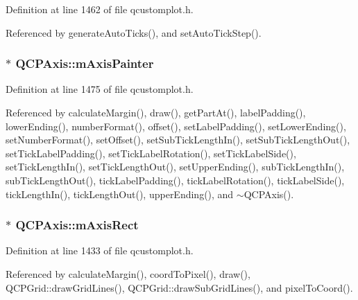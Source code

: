 Definition at line 1462 of file qcustomplot.\+h.



Referenced by generate\+Auto\+Ticks(), and set\+Auto\+Tick\+Step().

\hypertarget{class_q_c_p_axis_aeeae00935bd2dab82d64f32544a90913}{}
\subsubsection[{m\+Axis\+Painter}]{$\ast$ Q\+C\+P\+Axis\+::m\+Axis\+Painter\hspace{0.3cm}{\ttfamily [protected]}}\label{class_q_c_p_axis_aeeae00935bd2dab82d64f32544a90913}


Definition at line 1475 of file qcustomplot.\+h.



Referenced by calculate\+Margin(), draw(), get\+Part\+At(), label\+Padding(), lower\+Ending(), number\+Format(), offset(), set\+Label\+Padding(), set\+Lower\+Ending(), set\+Number\+Format(), set\+Offset(), set\+Sub\+Tick\+Length\+In(), set\+Sub\+Tick\+Length\+Out(), set\+Tick\+Label\+Padding(), set\+Tick\+Label\+Rotation(), set\+Tick\+Label\+Side(), set\+Tick\+Length\+In(), set\+Tick\+Length\+Out(), set\+Upper\+Ending(), sub\+Tick\+Length\+In(), sub\+Tick\+Length\+Out(), tick\+Label\+Padding(), tick\+Label\+Rotation(), tick\+Label\+Side(), tick\+Length\+In(), tick\+Length\+Out(), upper\+Ending(), and $\sim$\+Q\+C\+P\+Axis().

\hypertarget{class_q_c_p_axis_a6f150b65a202f32936997960e331dfcb}{}
\subsubsection[{m\+Axis\+Rect}]{$\ast$ Q\+C\+P\+Axis\+::m\+Axis\+Rect\hspace{0.3cm}{\ttfamily [protected]}}\label{class_q_c_p_axis_a6f150b65a202f32936997960e331dfcb}


Definition at line 1433 of file qcustomplot.\+h.



Referenced by calculate\+Margin(), coord\+To\+Pixel(), draw(), Q\+C\+P\+Grid\+::draw\+Grid\+Lines(), Q\+C\+P\+Grid\+::draw\+Sub\+Grid\+Lines(), and pixel\+To\+Coord().

